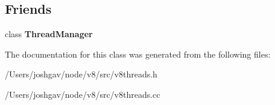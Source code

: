 \subsection*{Friends}
\begin{DoxyCompactItemize}
\item 
class {\bfseries Thread\+Manager}\hypertarget{classv8_1_1internal_1_1_thread_state_a2a28fc3c6cee05204a42286ac77ace1a}{}\label{classv8_1_1internal_1_1_thread_state_a2a28fc3c6cee05204a42286ac77ace1a}

\end{DoxyCompactItemize}


The documentation for this class was generated from the following files\+:\begin{DoxyCompactItemize}
\item 
/\+Users/joshgav/node/v8/src/v8threads.\+h\item 
/\+Users/joshgav/node/v8/src/v8threads.\+cc\end{DoxyCompactItemize}
